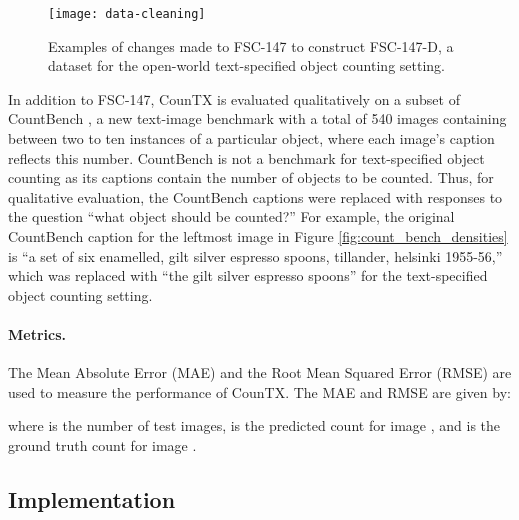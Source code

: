 \documentclass{bmvc2k}
\begin{document}
\begin{figure*}[h!]
\centering
\texttt{[image: data-cleaning]}
\vspace{-7mm}
   \caption{Examples of changes made to FSC-147 to construct FSC-147-D, a dataset for the open-world text-specified object counting setting.}
\vspace{-3mm}
\label{fig:mod_fsc147}
\end{figure*}

In addition to FSC-147, CounTX is evaluated qualitatively on a subset of CountBench \cite{paiss2023countclip}, a new text-image benchmark with a total of 540 images containing between two to ten instances of a particular object, where each image's caption reflects this number. CountBench is not a benchmark for text-specified object counting as its captions contain the number of objects to be counted. Thus, for qualitative evaluation, the CountBench captions were replaced with responses to the question ``what object should be counted?'' For example, the original CountBench caption for the leftmost image in Figure \ref{fig:count_bench_densities} is ``a set of six enamelled, gilt silver espresso spoons, tillander, helsinki 1955-56,'' which was replaced with ``the gilt silver espresso spoons'' for the text-specified object counting setting.

\paragraph{Metrics.} The Mean Absolute Error (MAE) and the Root Mean Squared Error (RMSE) are used to measure the performance of CounTX. The MAE and RMSE are given by: 

where  is the number of test images,  is the predicted count for image , and  is the ground truth count for image .
\subsection{Implementation}
\end{document}
